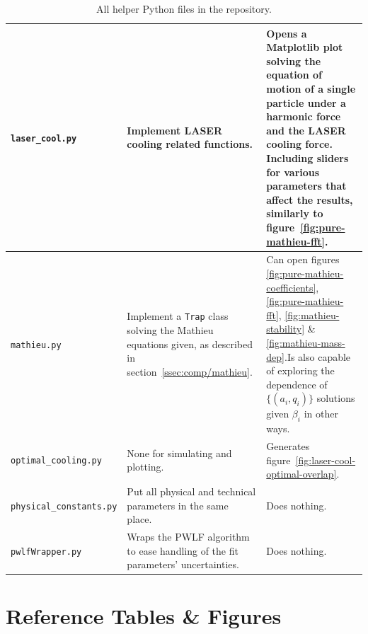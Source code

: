 \begin{table}
\begin{tabularx}{\textwidth}{l|X|X}
\hline
\texttt{laser\_cool.py}         & Implement LASER cooling related functions.                                                                                                             & Opens a Matplotlib plot solving the equation of motion of a single particle under a harmonic force and the LASER cooling force. Including sliders for various parameters that affect the results, similarly to figure~\ref{fig:pure-mathieu-fft}.    \\
\hline
\texttt{mathieu.py}             & Implement a \texttt{Trap} class solving the Mathieu equations given, as described in section~\ref{ssec:comp/mathieu}.                               & Can open figures \ref{fig:pure-mathieu-coefficients}, \ref{fig:pure-mathieu-fft}, \ref{fig:mathieu-stability} \& \ref{fig:mathieu-mass-dep}.Is also capable of exploring the dependence of $\{(a_i, q_i)\}$ solutions given $\beta_i$ in other ways. \\
\hline
\texttt{optimal\_cooling.py}    & None for simulating and plotting.                                                                                                                      & Generates figure~\ref{fig:laser-cool-optimal-overlap}.                                                                                                                                                                                              \\
\hline
\texttt{physical\_constants.py} & Put all physical and technical parameters in the same place.                                                                                           & Does nothing.                                                                                                                                                                                                                                        \\
\hline
\texttt{pwlfWrapper.py}         & Wraps the PWLF algorithm to ease handling of the fit parameters' uncertainties.                                                                        & Does nothing.
\end{tabularx}
\caption{All helper Python files in the repository.}
\label{tbl:helper-scripts}
\end{table}

\clearpage
\section{Reference Tables \& Figures}

